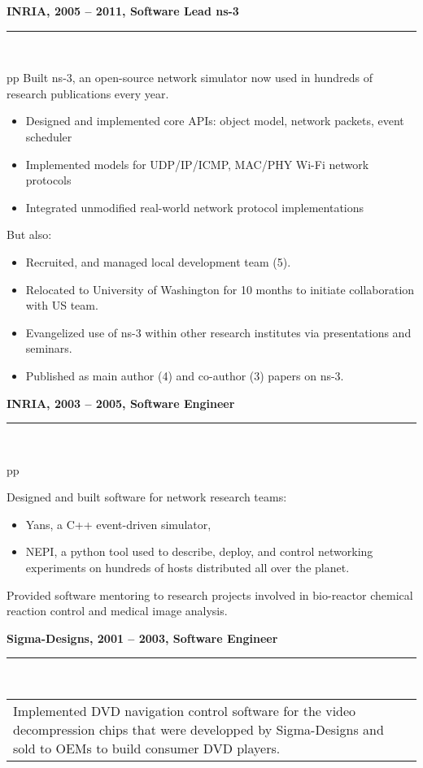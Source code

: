 \documentclass[a4paper,12pt]{article}
\newcommand{\ligne}[1]{\rule[0.5ex]{\textwidth}{#1}\\}
\newcommand{\styleRub}[1]{\textbf{\large #1}\par}
\newcommand{\indentStd}{\noindent\hspace*{10pt}}
\newenvironment{rubrique}[2][\linewidth]%
{\styleRub{#2}%
\ligne{0.5mm}
\setlength{\lenB}{#1}%
\setlength{\lenC}{\linewidth}%
\addtolength{\lenC}{-\lenA}%
\addtolength{\lenC}{-\lenB}%
\addtolength{\lenC}{-19pt}
\indentStd\begin{tabular}[t]{p{\lenB}p{\lenC}}}
{\end{tabular}}
\newlength{\lenA} %
\newlength{\lenB} %
\newlength{\lenC} %
\begin{document}
\pagebreak

\begin{rubrique}{INRIA, 2005 -- 2011, Software Lead ns-3}
  Built ns-3, an open-source network simulator now used in hundreds of research publications every year. 
 
  \begin{itemize}
  \item Designed and implemented core APIs: object model, network packets, event scheduler
  \item Implemented models for UDP/IP/ICMP, MAC/PHY Wi-Fi network protocols
  \item Integrated unmodified real-world network protocol implementations
  \end{itemize}

  But also:
  \begin{itemize}
  \item Recruited, and managed local development team (5).
  \item Relocated to University of Washington for 10 months to initiate collaboration with US team.
  \item Evangelized use of ns-3 within other research institutes via
    presentations and seminars.
  \item Published as main author (4) and co-author (3) papers on ns-3.
  \end{itemize}

\end{rubrique}

\vspace{0.5cm}
\begin{rubrique}{INRIA, 2003 -- 2005, Software Engineer}

  Designed and built software for network research teams:  
  \begin{itemize}
  \item Yans, a C++ event-driven simulator,
  \item NEPI, a python tool used to describe, deploy, and control networking
    experiments on hundreds of hosts distributed all over the planet.
  \end{itemize}

  Provided software mentoring to research projects involved in 
  bio-reactor chemical reaction control and medical image analysis.

\end{rubrique}

\vspace{0.5cm}
\begin{rubrique}{Sigma-Designs, 2001 -- 2003, Software Engineer}

  Implemented DVD navigation control software for the video
  decompression chips that were developped by Sigma-Designs and
  sold to OEMs to build consumer DVD players.

\end{rubrique}
\end{document}
